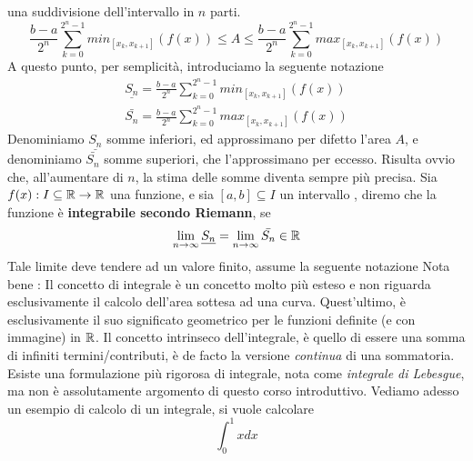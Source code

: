 \documentclass[10pt, letterpaper]{report}
\begin{document}
una suddivisione dell'intervallo in $n$ parti.
$$
    \frac{b-a}{2^n}\displaystyle \sum_{k=0}^{2^n-1}min_{[x_k,x_{k+1}]}(f(x)) \le A \le \frac{b-a}{2^n}\displaystyle
    \sum_{k=0}^{2^n-1}max_{[x_k,x_{k+1}]}(f(x))
$$
A questo punto, per semplicità, introduciamo la seguente notazione
$$ \begin{matrix}
        \underline{S_n}=\frac{b-a}{2^n}\displaystyle \sum_{k=0}^{2^n-1}min_{[x_k,x_{k+1}]}(f(x)) \\
        \bar{S_n}=\frac{b-a}{2^n}\displaystyle
        \sum_{k=0}^{2^n-1}max_{[x_k,x_{k+1}]}(f(x))
    \end{matrix}$$
Denominiamo $\underline{S_n}$ somme inferiori, ed approssimano per difetto l'area
$A$, e denominiamo $\bar{S_n}$ somme superiori, che l'approssimano per
eccesso. Risulta ovvio che, all'aumentare di $n$, la stima delle somme
diventa sempre più precisa. \acc
{} Sia $f(x) : I\subseteq{\mathbb R}\rightarrow {\mathbb R}$ una funzione, e sia $[a,b]\subseteq I$ un intervallo
, diremo che la funzione è \textbf{integrabile secondo Riemann},
se
$$\lim_{n\rightarrow\infty} \underline{S_n} =
    \lim_{n\rightarrow\infty} \bar{S_n} \in {\mathbb R}$$
Tale limite deve tendere ad un valore finito, assume la seguente notazione
Nota bene : Il concetto di integrale è un concetto molto più esteso e non riguarda esclusivamente il 
calcolo dell'area sottesa ad una curva. Quest'ultimo, è esclusivamente il suo significato geometrico 
per le funzioni definite (e con immagine) in ${\mathbb R}$. Il concetto intrinseco dell'integrale, è quello di 
essere una somma di infiniti termini/contributi, è de facto la versione \textit{continua} di una 
sommatoria.
Esiste una formulazione più rigorosa di integrale, nota come \textit{integrale di Lebesgue}, ma non 
è assolutamente argomento di questo corso introduttivo.\acc
Vediamo adesso un esempio di calcolo di un integrale, si vuole calcolare 
$$\int_0^1 x dx $$
\begin{center}
\end{center}
\end{document}
